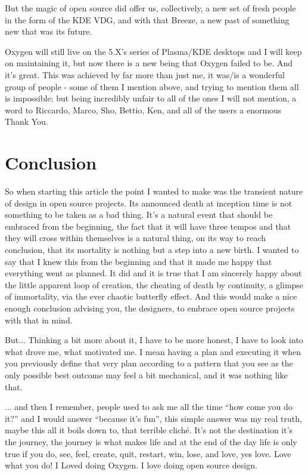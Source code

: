 But the magic of open source did offer us, collectively, a new set of fresh people in the form of the KDE VDG, and with that Breeze, a new past of something new that was its future.

Oxygen will still live on the 5.X's series of Plasma/KDE desktops and I will keep on maintaining it, but now there is a new being that Oxygen failed to be. And it's great.
This was achieved by far more than just me, it was/is a wonderful group of people - some of them I mention above, and trying to mention them all is impossible; but being incredibly unfair to all of the ones I will not mention, a word to Riccardo, Marco, Sho, Bettio, Ken, and all of the users a enormous Thank You. 

\section*{Conclusion}
So when starting this article the point I wanted to make was the transient nature of design in open source projects. Its announced death at inception time is not something to be taken as a bad thing. It's a natural event that should be embraced from the beginning, the fact that it will have three tempos and that they will cross within themselves is a natural thing, on its way to reach conclusion, that its mortality is nothing but a step into a new birth.
I wanted to say that I knew this from the beginning and that it made me happy that everything went as planned. It did and it is true that I am sincerely happy about the little apparent loop of creation, the cheating of death by continuity, a glimpse of immortality, via the ever chaotic butterfly effect. And this would make a nice enough conclusion advising you, the designers, to embrace open source projects with that in mind.

But... Thinking a bit more about it, I have to be more honest, I have to look into what drove me, what motivated me. I mean having a plan and executing it when you previously define that very plan according to a pattern that you see as the only possible best outcome may feel a bit mechanical, and it was nothing like that.

... and then I remember, people used to ask me all the time “how come you do it?” and I would answer “because it's fun”, this simple answer was my real truth, maybe this all it boils down to, that terrible cliché. It's not the destination it's the journey, the journey is what makes life and at the end of the day life is only true if you do, see, feel, create, quit, restart, win, lose, and love, yes love. Love what you do! I Loved doing Oxygen. I love doing open source design.

